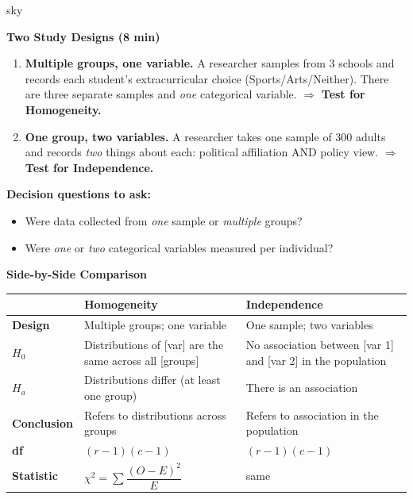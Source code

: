 \documentclass[10pt]{article}
\begin{document}
\begin{skillbox}[Lesson]{sky}
\begin{minipage}[t]{0.48\linewidth}
    \textbf{Two Study Designs (8 min)}
    \begin{enumerate}
        \item \textbf{Multiple groups, one variable.} A researcher samples from 3 schools
              and records each student's extracurricular choice (Sports/Arts/Neither).
              There are three separate samples and \emph{one} categorical variable.
              $\Rightarrow$ \textbf{Test for Homogeneity.}
        \item \textbf{One group, two variables.} A researcher takes one sample of 300 adults
              and records \emph{two} things about each: political affiliation AND policy view.
              $\Rightarrow$ \textbf{Test for Independence.}
    \end{enumerate}
    \textbf{Decision questions to ask:}
    \begin{itemize}
        \item Were data collected from \emph{one} sample or \emph{multiple} groups?
        \item Were \emph{one} or \emph{two} categorical variables measured per individual?
    \end{itemize}
\end{minipage}
\hfill
\begin{minipage}[t]{0.48\linewidth}
    \textbf{Side-by-Side Comparison}

    \renewcommand{\arraystretch}{1.8}
    \begin{tabularx}{\linewidth}{@{} l X X @{}}
        & \textbf{Homogeneity} & \textbf{Independence} \\
        \hline
        \textbf{Design} & Multiple groups; one variable & One sample; two variables \\
        \textbf{$H_0$} & Distributions of [var] are the same across all [groups] & No association between [var 1] and [var 2] in the population \\
        \textbf{$H_a$} & Distributions differ (at least one group) & There is an association \\
        \textbf{Conclusion} & Refers to distributions across groups & Refers to association in the population \\
        \textbf{df} & $(r-1)(c-1)$ & $(r-1)(c-1)$ \\
        \textbf{Statistic} & $\chi^2 = \sum\dfrac{(O-E)^2}{E}$ & same \\
    \end{tabularx}
\end{minipage}
\end{skillbox}
\end{document}

